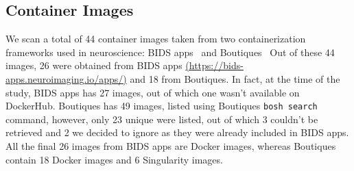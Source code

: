 \documentclass[a4paper,num-refs]{oup-contemporary}
\begin{document}
%
%
\subsection{Container Images}

We scan a total of 44 container images taken from two containerization frameworks
used in neuroscience: BIDS
apps~\cite{gorgolewski2017bids} and Boutiques~\cite{glatard2018boutiques}
Out of these 44 images, 26 were obtained from BIDS apps
\href{https://bids-apps.neuroimaging.io/apps/}{(https://bids-apps.neuroimaging.io/apps/)} 
and 18 from Boutiques. In fact, at the time of the study, BIDS apps has 27 images,
out of which one wasn't available on DockerHub. Boutiques has 49 images, listed using
Boutiques \texttt{bosh search} command,
however, only 23 unique were listed, out of which 3 couldn't be retrieved and 2
we decided to ignore as they were already included in BIDS apps. All the final 26 images
from BIDS apps are Docker images, whereas Boutiques contain 18 Docker images
and 6 Singularity images.
\end{document}
